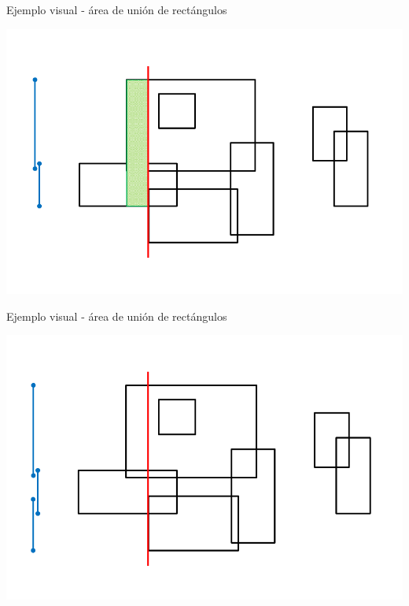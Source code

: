 \documentclass[compress]{beamer}
\begin{document}
\begin{frame}{Ejemplo visual - área de unión de rectángulos}
\begin{center}
\includegraphics[scale=0.4]{images/sweep_line_5.png}
\end{center}
\end{frame}

\begin{frame}{Ejemplo visual - área de unión de rectángulos}
\begin{center}
\includegraphics[scale=0.4]{images/sweep_line_6.png}
\end{center}
\end{frame}
\end{document}
